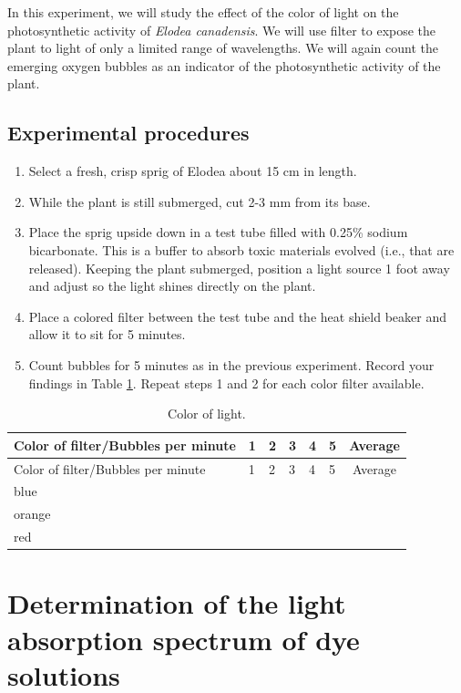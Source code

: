 In this experiment, we will study the effect of the color of light on
the photosynthetic activity of \emph{Elodea canadensis}. We will use
filter to expose the plant to light of only a limited range of
wavelengths. We will again count the emerging oxygen bubbles as an
indicator of the photosynthetic activity of the plant.

\subsection{Experimental procedures}\label{experimental-procedures-22}

\begin{enumerate}
\def\labelenumi{\arabic{enumi}.}
\tightlist
\item
  Select a fresh, crisp sprig of Elodea about 15 cm in length.
\item
  While the plant is still submerged, cut 2-3 mm from its base.
\item
  Place the sprig upside down in a test tube filled with 0.25\% sodium
  bicarbonate. This is a buffer to absorb toxic materials evolved (i.e.,
  that are released). Keeping the plant submerged, position a light
  source 1 foot away and adjust so the light shines directly on the
  plant.
\item
  Place a colored filter between the test tube and the heat shield
  beaker and allow it to sit for 5 minutes.
\item
  Count bubbles for 5 minutes as in the previous experiment. Record your
  findings in Table \ref{tab:color}. Repeat steps 1 and 2 for each color
  filter available.
\end{enumerate}

\begin{longtable}[]{@{}llllllc@{}}
\caption{\label{tab:color} Color of light.}\tabularnewline
\toprule
Color of filter/Bubbles per minute & 1 & 2 & 3 & 4 & 5 &
Average\tabularnewline
\midrule
\endfirsthead
\toprule
Color of filter/Bubbles per minute & 1 & 2 & 3 & 4 & 5 &
Average\tabularnewline
\midrule
\endhead
blue & & & & & &\tabularnewline
orange & & & & & &\tabularnewline
red & & & & & &\tabularnewline
\bottomrule
\end{longtable}

\section{Determination of the light absorption spectrum of dye
solutions}\label{determination-of-the-light-absorption-spectrum-of-dye-solutions}


